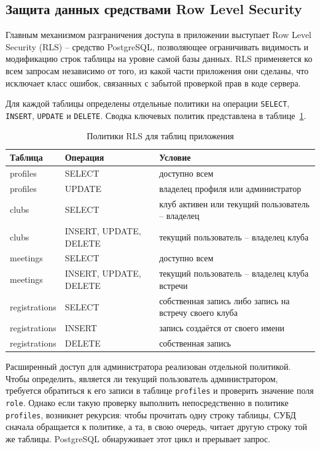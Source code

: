 \subsection{Защита данных средствами Row Level Security}

Главным механизмом разграничения доступа в приложении выступает Row Level
Security (RLS) -- средство PostgreSQL, позволяющее ограничивать видимость
и модификацию строк таблицы на уровне самой базы данных. RLS применяется
ко всем запросам независимо от того, из какой части приложения они
сделаны, что исключает класс ошибок, связанных с забытой проверкой
прав в коде сервера.

Для каждой таблицы определены отдельные политики на операции
\texttt{SELECT}, \texttt{INSERT}, \texttt{UPDATE} и \texttt{DELETE}.
Сводка ключевых политик представлена в таблице~\ref{tab:rls}.

\begin{table}[h]
\centering
\caption{Политики RLS для таблиц приложения}
\label{tab:rls}
\begin{tabular}{|p{2.5cm}|p{2.5cm}|p{9cm}|}
\hline
\textbf{Таблица} & \textbf{Операция} & \textbf{Условие} \\
\hline
profiles & SELECT & доступно всем \\
\hline
profiles & UPDATE & владелец профиля или администратор \\
\hline
clubs & SELECT & клуб активен или текущий пользователь -- владелец \\
\hline
clubs & INSERT, UPDATE, DELETE & текущий пользователь -- владелец клуба \\
\hline
meetings & SELECT & доступно всем \\
\hline
meetings & INSERT, UPDATE, DELETE & текущий пользователь -- владелец клуба встречи \\
\hline
registrations & SELECT & собственная запись либо запись на встречу своего клуба \\
\hline
registrations & INSERT & запись создаётся от своего имени \\
\hline
registrations & DELETE & собственная запись \\
\hline
\end{tabular}
\end{table}

Расширенный доступ для администратора реализован отдельной политикой.
Чтобы определить, является ли текущий пользователь администратором,
требуется обратиться к его записи в таблице \texttt{profiles} и
проверить значение поля \texttt{role}. Однако если такую проверку
выполнить непосредственно в политике \texttt{profiles}, возникнет
рекурсия: чтобы прочитать одну строку таблицы, СУБД сначала
обращается к политике, а та, в свою очередь, читает другую строку
той же таблицы. PostgreSQL обнаруживает этот цикл и прерывает
запрос.

